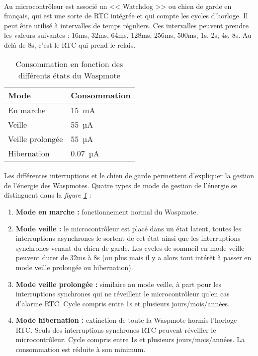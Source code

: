     \paragraph{} Au microcontrôleur est associé un << Watchdog >> ou chien de garde en français, qui est une sorte de RTC intégrée et qui compte les cycles d'horloge. Il peut être utilisé à intervalles de temps réguliers. Ces intervalles peuvent prendre les valeurs suivantes : 16ms, 32ms, 64ms, 128ms, 256ms, 500ms, 1s, 2s, 4s, 8s. Au delà de 8s, c'est le RTC qui prend le relais.

    \begin{table}[h]
        \centering
        \begin{tabular}{l | l}
            \bfseries{Mode}     & \bfseries{Consommation}\tabularnewline\hline
            En marche           & 15~mA\tabularnewline
            Veille              & 55~µA\tabularnewline
            Veille prolongée    & 55~µA\tabularnewline
            Hibernation         & 0.07~µA
        \end{tabular}
        \caption{Consommation en fonction des différents états du Waspmote}
        \label{tab:conso}
    \end{table}
    
    \paragraph{} Les différentes interruptions et le chien de garde permettent d'expliquer  la gestion de l'énergie des Waspmotes. Quatre types de mode de gestion de l'énergie se distinguent dans la \textit{figure \ref{tab:conso}} :
    
    \begin{enumerate}
        \item \textbf{Mode en marche :} fonctionnement normal du Waspmote.
        \item \textbf{Mode veille :} le microcontrôleur est placé dans un état latent, toutes les interruptions asynchrones le sortent de cet état ainsi que les interruptions synchrones venant du chien de garde. Les cycles de sommeil en mode veille peuvent durer de 32ms à 8s (ou plus mais il y a alors tout intérêt à passer en mode veille prolongée ou hibernation).
        
        \item \textbf{Mode veille prolongée :} similaire au mode veille, à part pour les interruptions synchrones qui ne réveillent le microcontrôleur qu'en cas d'alarme RTC. Cycle compris entre 1s et plusieurs jours/mois/années.
        
        \item \textbf{Mode hibernation :} extinction de toute la Waspmote hormis l'horloge RTC. Seuls des interruptions synchrones RTC peuvent réveiller le microcontrôleur. Cycle compris entre 1s et plusieurs jours/mois/années. La consommation est réduite à son minimum.
    \end{enumerate}
    
